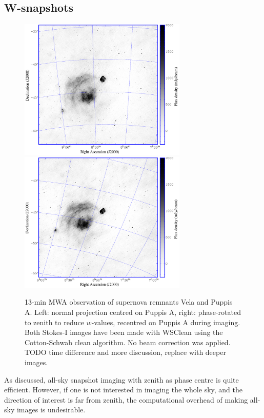 \documentclass[useAMS,usenatbib]{mn2e}
\begin{document}
\subsection{W-snapshots} \label{sec:snapshot-imaging}
\begin{figure}
\begin{center}
\includegraphics[width=8cm]{img/vela-normal-projection}
\includegraphics[width=8cm]{img/vela-zenith-projection}
\caption{13-min MWA observation of supernova remnants Vela and Puppis A. Left: normal projection centred on Puppis A, right: phase-rotated to zenith to reduce $w$-values, recentred on Puppis A during imaging. Both Stokes-I images have been made with WSClean using the Cotton-Schwab clean algorithm. No beam correction was applied. TODO time difference and more discussion, replace with deeper images.}
\label{fig:vela-projection-example}
\end{center}
\end{figure}
As discussed, all-sky snapshot imaging with zenith as phase centre is quite efficient. However, if one is not interested in imaging the whole sky, and the direction of interest is far from zenith, the computational overhead of making all-sky images is undesirable.
\end{document}
